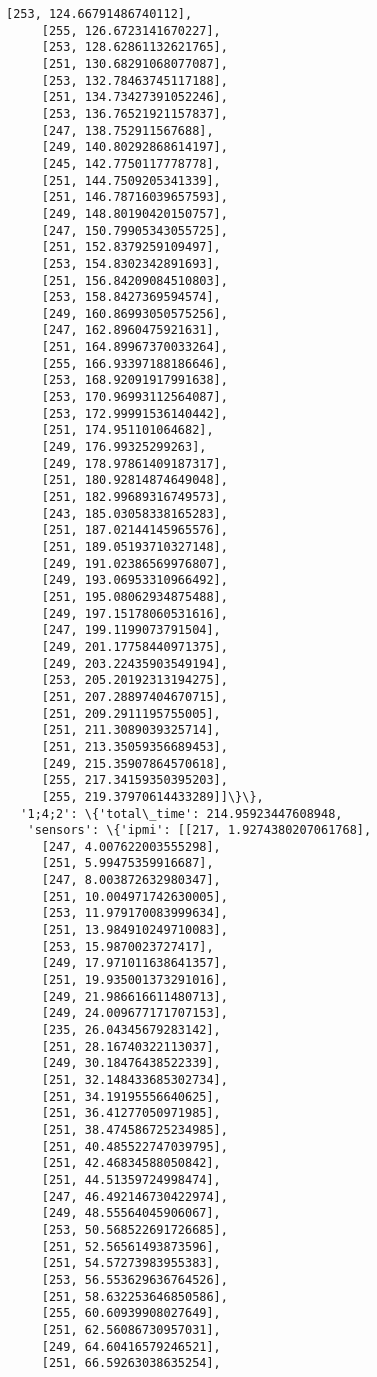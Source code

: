 \documentclass[11pt]{article}
\begin{document}
\begin{tcolorbox}[breakable, size=fbox, boxrule=.5pt, pad at break*=1mm, opacityfill=0]
\begin{Verbatim}[commandchars=\\\{\}]
     [253, 124.66791486740112],
     [255, 126.6723141670227],
     [253, 128.62861132621765],
     [251, 130.68291068077087],
     [253, 132.78463745117188],
     [251, 134.73427391052246],
     [253, 136.76521921157837],
     [247, 138.752911567688],
     [249, 140.80292868614197],
     [245, 142.7750117778778],
     [251, 144.7509205341339],
     [251, 146.78716039657593],
     [249, 148.80190420150757],
     [247, 150.79905343055725],
     [251, 152.8379259109497],
     [253, 154.8302342891693],
     [251, 156.84209084510803],
     [253, 158.8427369594574],
     [249, 160.86993050575256],
     [247, 162.8960475921631],
     [251, 164.89967370033264],
     [255, 166.93397188186646],
     [253, 168.92091917991638],
     [253, 170.96993112564087],
     [253, 172.99991536140442],
     [251, 174.951101064682],
     [249, 176.99325299263],
     [249, 178.97861409187317],
     [251, 180.92814874649048],
     [251, 182.99689316749573],
     [243, 185.03058338165283],
     [251, 187.02144145965576],
     [251, 189.05193710327148],
     [249, 191.02386569976807],
     [249, 193.06953310966492],
     [251, 195.08062934875488],
     [249, 197.15178060531616],
     [247, 199.1199073791504],
     [249, 201.17758440971375],
     [249, 203.22435903549194],
     [253, 205.20192313194275],
     [251, 207.28897404670715],
     [251, 209.2911195755005],
     [251, 211.3089039325714],
     [251, 213.35059356689453],
     [249, 215.35907864570618],
     [255, 217.34159350395203],
     [255, 219.37970614433289]]\}\},
  '1;4;2': \{'total\_time': 214.95923447608948,
   'sensors': \{'ipmi': [[217, 1.9274380207061768],
     [247, 4.007622003555298],
     [251, 5.99475359916687],
     [247, 8.003872632980347],
     [251, 10.004971742630005],
     [253, 11.979170083999634],
     [251, 13.984910249710083],
     [253, 15.9870023727417],
     [249, 17.971011638641357],
     [251, 19.935001373291016],
     [249, 21.986616611480713],
     [249, 24.009677171707153],
     [235, 26.04345679283142],
     [251, 28.16740322113037],
     [249, 30.18476438522339],
     [251, 32.148433685302734],
     [251, 34.19195556640625],
     [251, 36.41277050971985],
     [251, 38.474586725234985],
     [251, 40.485522747039795],
     [251, 42.46834588050842],
     [251, 44.51359724998474],
     [247, 46.492146730422974],
     [249, 48.55564045906067],
     [253, 50.568522691726685],
     [251, 52.56561493873596],
     [251, 54.57273983955383],
     [253, 56.553629636764526],
     [251, 58.632253646850586],
     [255, 60.60939908027649],
     [251, 62.56086730957031],
     [249, 64.60416579246521],
     [251, 66.59263038635254],

\end{Verbatim}
\end{tcolorbox}
\end{document}
